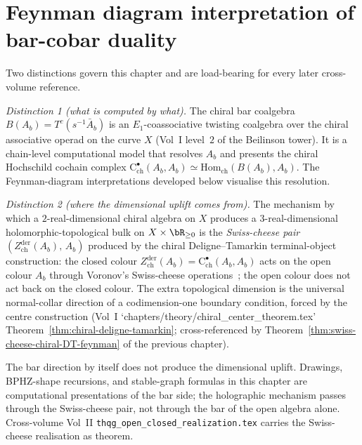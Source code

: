 \chapter{Feynman diagram interpretation of bar-cobar duality}
\label{ch:v1-feynman}

\providecommand{\PhiFA}{\Phi^{\mathrm{FA}}}
\providecommand{\SpCh}{\mathrm{Sp}^{\mathrm{ch}}}

\begin{remark}
\label{rem:bar-computational-swiss-cheese-explanatory-feyn}
Two distinctions govern this chapter and are load-bearing for every
later cross-volume reference.

\emph{Distinction 1 \textup{(}what is computed by what\textup{)}.}
The chiral bar coalgebra $B(A_b) = T^c(s^{-1}\bar A_b)$ is an
$E_1$-coassociative twisting coalgebra over the chiral associative
operad on the curve $X$ (Vol~I level~$2$ of the Beilinson tower).
It is a chain-level computational model that resolves $A_b$ and
presents the chiral Hochschild cochain complex
$\mathrm{C}^\bullet_{\mathrm{ch}}(A_b, A_b) \simeq
\mathrm{Hom}_{\mathrm{ch}}(B(A_b), A_b)$. The Feynman-diagram
interpretations developed below visualise this resolution.

\emph{Distinction 2 \textup{(}where the dimensional uplift comes
from\textup{)}.} The mechanism by which a $2$-real-dimensional chiral
algebra on $X$ produces a $3$-real-dimensional
holomorphic-topological bulk on $X \times \bR_{\ge 0}$ is the
\emph{Swiss-cheese pair} $(Z^{\mathrm{der}}_{\mathrm{ch}}(A_b),\, A_b)$
produced by the chiral Deligne--Tamarkin terminal-object construction:
the closed colour
$Z^{\mathrm{der}}_{\mathrm{ch}}(A_b) = \mathrm{C}^\bullet_{\mathrm{ch}}
(A_b, A_b)$ acts on the open colour $A_b$ through Voronov's
Swiss-cheese operations~\cite{Voronov99}; the open colour does not
act back on the closed colour. The extra topological dimension is the
universal normal-collar direction of a codimension-one boundary
condition, forced by the centre construction
\textup{(}Vol~I `chapters/theory/chiral\_center\_theorem.tex'
Theorem~\ref{thm:chiral-deligne-tamarkin}; cross-referenced by
Theorem~\ref{thm:swiss-cheese-chiral-DT-feynman} of the previous
chapter\textup{)}.

The bar direction by itself does not produce the dimensional uplift.
Drawings, BPHZ-shape recursions, and stable-graph formulas in this
chapter are computational presentations of the bar side; the
holographic mechanism passes through the Swiss-cheese pair, not
through the bar of the open algebra alone.  Cross-volume Vol~II
\texttt{thqg\_open\_closed\_realization.tex} carries the
Swiss-cheese realisation as theorem.
\end{remark}

